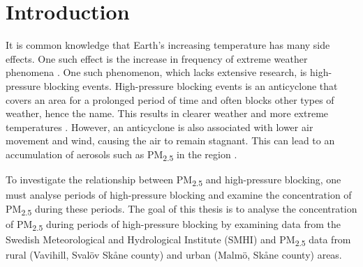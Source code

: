 \section{Introduction}
It is common knowledge that Earth's increasing temperature has many side effects. One such effect is the increase in frequency of extreme weather phenomena \cite{mitchellExtremeEventsDue2006}. One such phenomenon, which lacks extensive research, is high-pressure blocking events. High-pressure blocking events is an anticyclone that covers an area for a prolonged period of time and often blocks other types of weather, hence the name. This results in clearer weather and more extreme temperatures \cite{lupoAtmosphericBlockingEvents2020}. However, an anticyclone is also associated with lower air movement and wind, causing the air to remain stagnant. This can lead to an accumulation of aerosols such as PM\textsubscript{2.5} in the region \cite{caiImpactBlockingStructure2020}.

To investigate the relationship between PM\textsubscript{2.5} and high-pressure blocking, one must analyse periods of high-pressure blocking and examine the concentration of PM\textsubscript{2.5} during these periods. The goal of this thesis is to analyse the concentration of PM\textsubscript{2.5} during periods of high-pressure blocking by examining data from the Swedish Meteorological and Hydrological Institute (SMHI) and PM\textsubscript{2.5} data from rural (Vavihill, Svalöv Skåne county) and urban (Malmö, Skåne county) areas.
